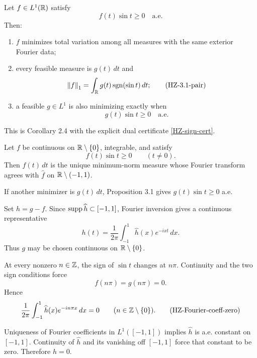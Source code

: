 \begin{proposition}
Let $f\in L^1(\mathbb{R})$ satisfy
\[
  f(t)\sin t\ge0\quad\text{a.e.}
  \tag{HZ-sign-condition}\label{HZ-sign-condition}
\]
Then:
\begin{enumerate}[label=(\arabic*)]
\item $f$ minimizes total variation among all measures with the same exterior Fourier data;
\item every feasible measure is $g(t)\,dt$ and
\[
  \left\lVert f\right\rVert_1=\int_{\mathbb{R}}g(t)\operatorname{sgn}(\sin t)\,dt;
  \tag{HZ-3.1-pair}\label{HZ-3.1-pair}
\]
\item a feasible $g\in L^1$ is also minimizing exactly when
\[
  g(t)\sin t\ge0\quad\text{a.e.}
  \tag{HZ-3.1-min}\label{HZ-3.1-min}
\]
\end{enumerate}
\end{proposition}

This is Corollary 2.4 with the explicit dual certificate \eqref{HZ-sign-cert}.

\begin{proposition}
Let $f$ be continuous on $\mathbb{R}\setminus\{0\}$, integrable, and satisfy
\[
  f(t)\sin t\ge0\qquad(t\ne0).
\]
Then $f(t)\,dt$ is the unique minimum-norm measure whose Fourier transform agrees with $\widehat f$ on $\mathbb{R}\setminus(-1,1)$.
\end{proposition}

\begin{argument}
\item If another minimizer is $g(t)\,dt$, Proposition 3.1 gives $g(t)\sin t\ge0$ a.e.
\item Set $h=g-f$. Since $\operatorname{supp}\widehat h\subset[-1,1]$, Fourier inversion gives a continuous representative
\[
  h(t)=\frac1{2\pi}\int_{-1}^{1}\widehat h(x)e^{-ixt}\,dx.
  \tag{HZ-band-inversion}\label{HZ-band-inversion}
\]
Thus $g$ may be chosen continuous on $\mathbb{R}\setminus\{0\}$.
\item At every nonzero $n\in\mathbb{Z}$, the sign of $\sin t$ changes at $n\pi$. Continuity and the two sign conditions force
\[
  f(n\pi)=g(n\pi)=0.
  \tag{HZ-lattice-zero}\label{HZ-lattice-zero}
\]
Hence
\[
  \frac1{2\pi}\int_{-1}^{1}\widehat h(x)e^{-in\pi x}\,dx=0
  \qquad(n\in\mathbb{Z}\setminus\{0\}).
  \tag{HZ-Fourier-coeff-zero}\label{HZ-Fourier-coeff-zero}
\]
\item Uniqueness of Fourier coefficients in $L^1([-1,1])$ implies $\widehat h$ is a.e. constant on $[-1,1]$. Continuity of $\widehat h$ and its vanishing off $[-1,1]$ force that constant to be zero. Therefore $h=0$.
\end{argument}

